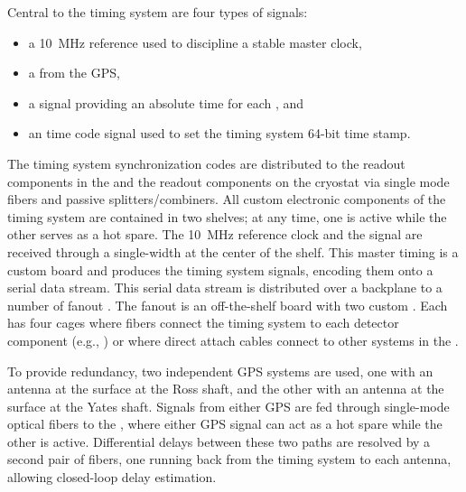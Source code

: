 Central to the timing system are four types of signals:
\begin{itemize}
\item a \SI{10}{\mega\hertz} reference used to discipline a stable master clock,
\item a  from the GPS,
\item a  signal providing an absolute time for each , and
\item an  time code signal
  used to set the timing system 64-bit time stamp.
\end{itemize}

The timing system synchronization codes are distributed to the  readout components in the  and the readout components on the cryostat via single mode fibers and passive splitters/combiners.
All custom electronic components of the timing system are contained in two  shelves; at any time, one is active while the other serves as a hot spare.
The \SI{10}{MHz} reference clock and the  signal are received through a single-width  at the center of the  shelf.
This master timing  is a custom board and produces the timing system signals, encoding them onto a serial data stream.
This serial data stream is distributed over a backplane to a number of fanout .
The fanout  is an off-the-shelf board with two custom .
Each  has four  cages where fibers connect the timing system to each detector component (e.g., ) or where direct attach cables connect to other systems in the .

To provide redundancy, two independent GPS systems are used,
one with an antenna at the surface at the Ross shaft, and the other
with an antenna at the surface at the Yates shaft. Signals from either
GPS are fed through single-mode optical fibers to the , where
either GPS signal can act as a hot spare while the other is active. 
Differential delays between these two paths are resolved by a second pair of fibers, one running back from the timing system to each antenna, allowing closed-loop delay estimation.


